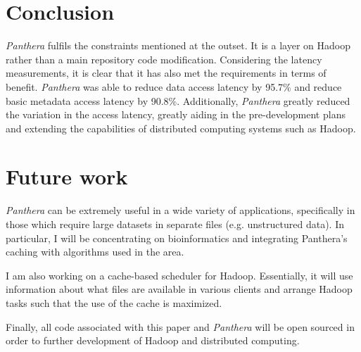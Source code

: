 \documentclass{article}
\begin{document}
\section{Conclusion}

\textit{Panthera} fulfils the constraints mentioned at the outset. It is a layer on Hadoop rather than a main repository code modification. Considering the latency measurements, it is clear that it has also met the requirements in terms of benefit. \textit{Panthera} was able to reduce data access latency by 95.7\% and reduce basic metadata access latency by 90.8\%. Additionally, \textit{Panthera} greatly reduced the variation in the access latency, greatly aiding in the pre-development plans and extending the capabilities of distributed computing systems such as Hadoop.

\section{Future work}
\textit{Panthera} can be extremely useful in a wide variety of applications, specifically in those which require large datasets in separate files (e.g. unstructured data). In particular, I will be concentrating on bioinformatics and integrating Panthera's caching with algorithms used in the area.

I am also working on a cache-based scheduler for Hadoop. Essentially, it will use information about what files are available in various clients and arrange Hadoop tasks such that the use of the cache is maximized.

Finally, all code associated with this paper and \textit{Panthera} will be open sourced in order to further development of Hadoop and distributed computing.

\nocite{*}



\end{document}
